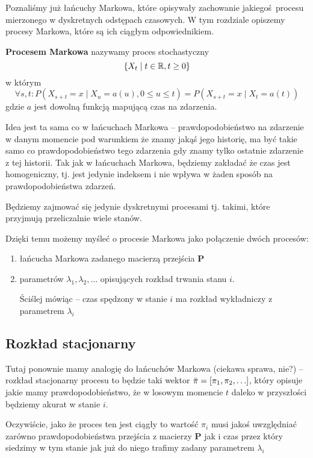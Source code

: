 Poznaliśmy już łańcuchy Markowa, które opisywały zachowanie jakiegoś procesu mierzonego w dyskretnych odstępach czasowych.
W tym rozdziale opiszemy procesy Markowa, które są ich ciągłym odpowiednikiem.

\begin{definition}
	\textbf{Procesem Markowa} nazywamy proces stochastyczny\[\set{X_t \mid t \in \real, t \geq 0} \] w którym
	\[
		\forall s, t: P(X_{s + t} = x \mid X_u = a(u), 0 \leq u \leq t) = P(X_{s + t} = x \mid X_t = a(t))
	\]
	gdzie \( a \) jest dowolną funkcją mapującą czas na zdarzenia.
\end{definition}

Idea jest ta sama co w łańcuchach Markowa -- prawdopodobieństwo na zdarzenie w danym momencie
pod warunkiem że znamy jakąś jego historię, ma być takie samo co prawdopodobieństwo tego zdarzenia gdy znamy tylko ostatnie zdarzenie z tej historii.
Tak jak w łańcuchach Markowa, będziemy zakładać że czas jest homogeniczny, tj. jest jedynie indeksem i nie wpływa w żaden sposób na prawdopodobieństwa zdarzeń.

Będziemy zajmować się jedynie dyskretnymi procesami tj. takimi, które przyjmują przeliczalnie wiele stanów.

Dzięki temu możemy myśleć o procesie Markowa jako połączenie dwóch procesów:
\begin{enumerate}
	\item łańcucha Markowa zadanego macierzą przejścia \( \mathbf{P} \)
	\item parametrów \( \lambda_1, \lambda_2, \dots \) opisujących rozkład trwania stanu \( i \).

	      Ściślej mówiąc -- czas spędzony w stanie \( i \) ma rozkład wykładniczy z parametrem \( \lambda_i \)
\end{enumerate}

\subsection{Rozkład stacjonarny}
Tutaj ponownie mamy analogię do łańcuchów Markowa (ciekawa sprawa, nie?) -- rozkład stacjonarny
procesu to będzie taki wektor \( \bar \pi = \brackets{\pi_1, \pi_2, \dots} \), który opisuje jakie mamy prawdopodobieństwo,
że w losowym momencie \( t \) daleko w przyszłości będziemy akurat w stanie \( i \).

Oczywiście, jako że proces ten jest ciągły to wartość \( \pi_i \) musi jakoś uwzględniać zarówno prawdopodobieństwa przejścia z macierzy \( \mathbf{P} \) jak i czas przez który siedzimy w tym stanie jak już do niego trafimy zadany parametrem \( \lambda_i \)

